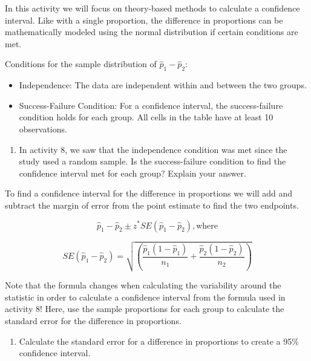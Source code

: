 \documentclass[
]{report}
\providecommand{\tightlist}{%
  \setlength{\itemsep}{0pt}\setlength{\parskip}{0pt}}
\begin{document}
In this activity we will focus on theory-based methods to calculate a confidence interval. Like with a single proportion, the difference in proportions can be mathematically modeled using the normal distribution if certain conditions are met.

Conditions for the sample distribution of \(\hat{p}_1-\hat{p}_2\):

\begin{itemize}
\item
  Independence: The data are independent within and between the two groups.
\item
  Success-Failure Condition: For a confidence interval, the success-failure condition holds for each group. All cells in the table have at least 10 observations.
\end{itemize}

\begin{enumerate}
\def\labelenumi{\arabic{enumi}.}
\setcounter{enumi}{3}
\tightlist
\item
  In activity 8, we saw that the independence condition was met since the study used a random sample. Is the success-failure condition to find the confidence interval met for each group? Explain your answer.
\end{enumerate}

\vspace{1in}

To find a confidence interval for the difference in proportions we will add and subtract the margin of error from the point estimate to find the two endpoints.

\[\hat{p}_1-\hat{p}_2\pm z^*SE(\hat{p}_1-\hat{p}_2), \text{where}\]

\[SE(\hat{p}_1-\hat{p}_2) = \sqrt{\left(\frac{\hat{p}_1 (1-\hat{p}_1)}{n_1}+\frac{\hat{p}_2 (1-\hat{p}_2)}{n_2}\right)}\]

Note that the formula changes when calculating the variability around the statistic in order to calculate a confidence interval from the formula used in activity 8! Here, use the sample proportions for each group to calculate the standard error for the difference in proportions.

\begin{enumerate}
\def\labelenumi{\arabic{enumi}.}
\setcounter{enumi}{4}
\tightlist
\item
  Calculate the standard error for a difference in proportions to create a 95\% confidence interval.
\end{enumerate}
\end{document}
